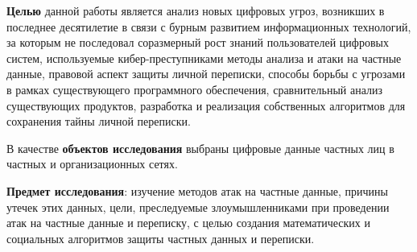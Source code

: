 \textbf{Целью} данной работы является %
 анализ новых цифровых угроз, возникших в последнее десятилетие в связи с бурным развитием информационных технологий, за которым не последовал соразмерный рост знаний пользователей цифровых систем, используемые кибер-преступниками методы анализа и атаки на частные данные, правовой аспект защиты личной переписки, способы борьбы с угрозами  в рамках существующего программного обеспечения, %
 сравнительный анализ существующих продуктов, разработка и реализация собственных алгоритмов для сохранения тайны личной переписки. 	
 
 В качестве \textbf{объектов исследования} выбраны цифровые данные частных лиц в частных и организационных сетях.
 
 \textbf{Предмет исследования}: изучение методов атак на частные данные, причины утечек этих данных, цели, преследуемые злоумышленниками при проведении атак на частные данные и переписку, с целью создания математических и социальных алгоритмов защиты частных данных и переписки. 
 \newpage %